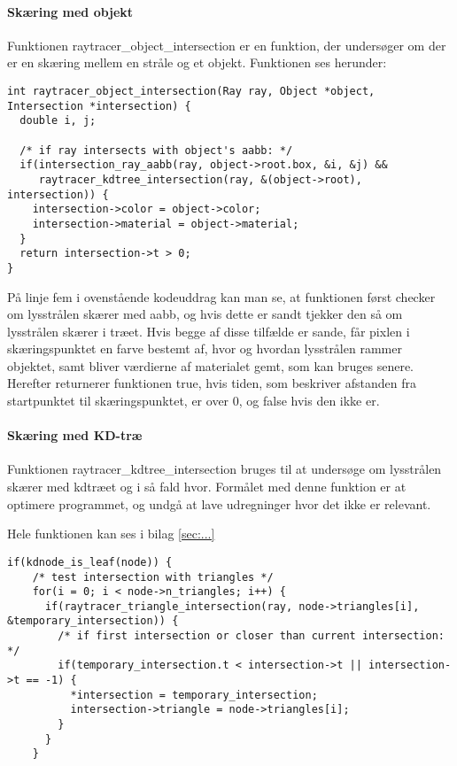 \paragraph{Skæring med objekt}

Funktionen raytracer\_object\_intersection er en funktion, der undersøger om der er en skæring mellem en stråle og et objekt. Funktionen ses herunder:

\begin{lstlisting}[style=Cstyle, caption=raytracer\_object\_intersection]
int raytracer_object_intersection(Ray ray, Object *object, Intersection *intersection) {
  double i, j;
  
  /* if ray intersects with object's aabb: */
  if(intersection_ray_aabb(ray, object->root.box, &i, &j) && 
     raytracer_kdtree_intersection(ray, &(object->root), intersection)) {
    intersection->color = object->color;
    intersection->material = object->material;
  }
  return intersection->t > 0;
}
\end{lstlisting}

På linje fem i ovenstående kodeuddrag kan man se, at funktionen først checker om lysstrålen skærer med aabb, og hvis dette er sandt tjekker den så om lysstrålen skærer i træet. Hvis begge af disse tilfælde er sande, får pixlen i skæringspunktet en farve bestemt af, hvor og hvordan lysstrålen rammer objektet, samt bliver værdierne af materialet gemt, som kan bruges senere. Herefter returnerer funktionen true, hvis tiden, som beskriver afstanden fra startpunktet til skæringspunktet, er over 0, og false hvis den ikke er.

\paragraph{Skæring med KD-træ}

Funktionen raytracer\_kdtree\_intersection bruges til at undersøge om lysstrålen skærer med kdtræet og i så fald hvor. Formålet med denne funktion er at optimere programmet, og undgå at lave udregninger hvor det ikke er relevant. 

Hele funktionen kan ses i bilag \ref{sec:...}

\begin{lstlisting}[style=Cstyle, caption=if(leaf)]
  if(kdnode_is_leaf(node)) {
    /* test intersection with triangles */
    for(i = 0; i < node->n_triangles; i++) {
      if(raytracer_triangle_intersection(ray, node->triangles[i], &temporary_intersection)) {
        /* if first intersection or closer than current intersection: */
        if(temporary_intersection.t < intersection->t || intersection->t == -1) {
          *intersection = temporary_intersection;
          intersection->triangle = node->triangles[i];
        }
      }
    }
\end{lstlisting}

